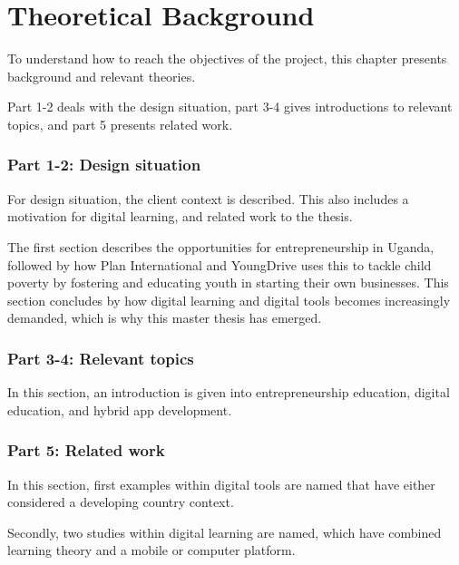 %

\section{Theoretical Background}

To understand how to reach the objectives of the project, this chapter presents background and relevant theories.

Part 1-2 deals with the design situation, part 3-4 gives introductions to relevant topics, and part 5 presents related work.

\subsubsection{Part 1-2: Design situation}
For design situation, the client context is described. This also includes a motivation for digital learning, and related work to the thesis.

The first section describes the opportunities for entrepreneurship in Uganda, followed by how Plan International and YoungDrive uses this to tackle child poverty by fostering and educating youth in starting their own businesses. This section concludes by how digital learning and digital tools becomes increasingly demanded, which is why this master thesis has emerged.

\subsubsection{Part 3-4: Relevant topics}
In this section, an introduction is given into entrepreneurship education, digital education, and hybrid app development.

\subsubsection{Part 5: Related work}
In this section, first examples within digital tools are named that have either considered a developing country context.

Secondly, two studies within digital learning are named, which have combined learning theory and a mobile or computer platform.







